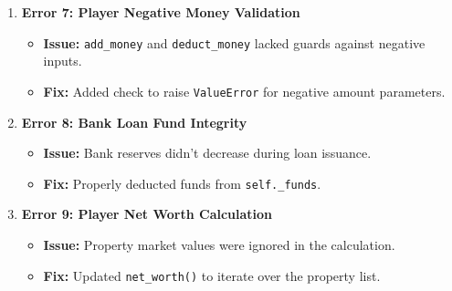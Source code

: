 \documentclass{article}
\begin{document}
\begin{enumerate}
\begin{itemize}
        \item \textbf{Fix:} Added a check in \texttt{pay_out()} to raise \texttt{ValueError} if funds are insufficient.
    \end{itemize}
    \item \textbf{Error 7: Player Negative Money Validation}
    \begin{itemize}
        \item \textbf{Issue:} \texttt{add_money} and \texttt{deduct_money} lacked guards against negative inputs.
        \item \textbf{Fix:} Added check to raise \texttt{ValueError} for negative amount parameters.
    \end{itemize}
    \item \textbf{Error 8: Bank Loan Fund Integrity}
    \begin{itemize}
        \item \textbf{Issue:} Bank reserves didn't decrease during loan issuance.
        \item \textbf{Fix:} Properly deducted funds from \texttt{self._funds}.
    \end{itemize}
    \item \textbf{Error 9: Player Net Worth Calculation}
    \begin{itemize}
        \item \textbf{Issue:} Property market values were ignored in the calculation.
        \item \textbf{Fix:} Updated \texttt{net_worth()} to iterate over the property list.
    \end{itemize}
\end{enumerate}
\end{document}

